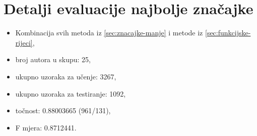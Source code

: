 \documentclass{article}
\begin{document}
\section{Detalji evaluacije najbolje značajke}
\label{sec:detalji-evaluacije}
\begin{itemize}
  \item Kombinacija svih metoda iz \ref{sec:znacajke-manje} i metode iz
     \ref{sec:funkcijske-rijeci},
  \item broj autora	u skupu: 25,
  \item ukupno uzoraka za učenje: 3267,
  \item ukupno uzoraka za testiranje: 1092,
  \item točnost: 0.88003665 (961/131),
  \item F mjera: 0.8712441.
\end{itemize}
\end{document}
